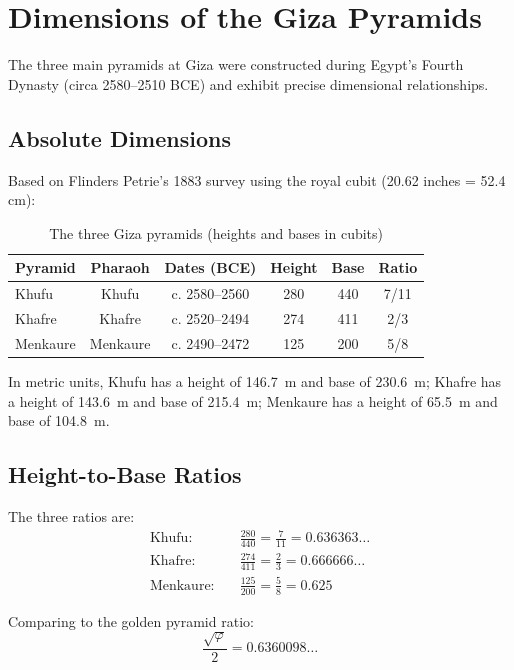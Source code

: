 \documentclass[11pt]{article}
\theoremstyle{definition}
\theoremstyle{remark}
\begin{document}
\section{Dimensions of the Giza Pyramids}

The three main pyramids at Giza were constructed during Egypt's Fourth Dynasty (circa 2580--2510 BCE) \cite{britannica-giza} and exhibit precise dimensional relationships.

\subsection{Absolute Dimensions}

Based on Flinders Petrie's 1883 survey \cite{petrie1883} using the royal cubit (20.62 inches = 52.4 cm):

\begin{table}[h]
\centering
\begin{tabular}{@{}lccccc@{}}
\toprule
Pyramid & Pharaoh & Dates (BCE) & Height & Base & Ratio \\
\midrule
Khufu & Khufu & c. 2580--2560 & 280 & 440 & 7/11 \\
Khafre & Khafre & c. 2520--2494 & 274 & 411 & 2/3 \\
Menkaure & Menkaure & c. 2490--2472 & 125 & 200 & 5/8 \\
\bottomrule
\end{tabular}
\caption{The three Giza pyramids (heights and bases in cubits)}
\label{tab:dimensions}
\end{table}

In metric units, Khufu has a height of 146.7~m and base of 230.6~m; Khafre has a height of 143.6~m and base of 215.4~m; Menkaure has a height of 65.5~m and base of 104.8~m.

\subsection{Height-to-Base Ratios}

The three ratios are:
\begin{align*}
\text{Khufu:} \quad &\frac{280}{440} = \frac{7}{11} = 0.636363\ldots \\
\text{Khafre:} \quad &\frac{274}{411} = \frac{2}{3} = 0.666666\ldots \\
\text{Menkaure:} \quad &\frac{125}{200} = \frac{5}{8} = 0.625
\end{align*}

Comparing to the golden pyramid ratio:
\[
\frac{\sqrt{\varphi}}{2} = 0.6360098\ldots
\]
\end{document}

